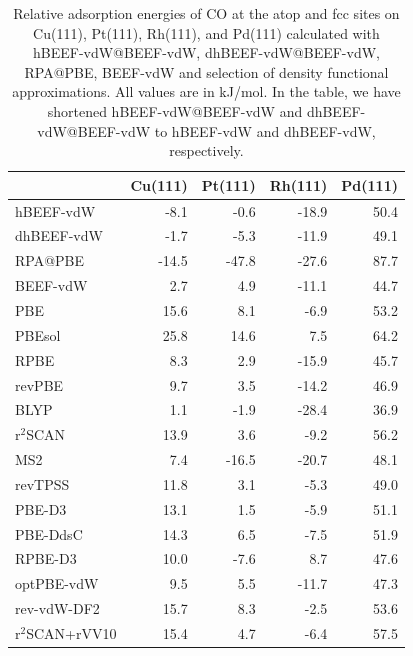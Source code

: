 \begin{table}[h]

\caption{\label{tab:co_ads}Relative adsorption energies of CO at the atop and fcc sites on Cu(111), Pt(111), Rh(111), and Pd(111) calculated with hBEEF-vdW@BEEF-vdW, dhBEEF-vdW@BEEF-vdW, RPA@PBE, BEEF-vdW and selection of density functional approximations. All values are in kJ/mol. In the table, we have shortened hBEEF-vdW@BEEF-vdW and dhBEEF-vdW@BEEF-vdW to hBEEF-vdW and dhBEEF-vdW, respectively.}
\begin{tabular}{lrrrr}
\toprule
 & Cu(111) & Pt(111) & Rh(111) & Pd(111) \\ 
\midrule
hBEEF-vdW & -8.1 & -0.6 & -18.9 & 50.4 \\
dhBEEF-vdW & -1.7 & -5.3 & -11.9 & 49.1 \\
RPA@PBE & -14.5 & -47.8 & -27.6 & 87.7 \\
BEEF-vdW & 2.7 & 4.9 & -11.1 & 44.7 \\
PBE & 15.6 & 8.1 & -6.9 & 53.2 \\
PBEsol & 25.8 & 14.6 & 7.5 & 64.2 \\
RPBE & 8.3 & 2.9 & -15.9 & 45.7 \\
revPBE & 9.7 & 3.5 & -14.2 & 46.9 \\
BLYP & 1.1 & -1.9 & -28.4 & 36.9 \\
r$^2$SCAN & 13.9 & 3.6 & -9.2 & 56.2 \\
MS2 & 7.4 & -16.5 & -20.7 & 48.1 \\
revTPSS & 11.8 & 3.1 & -5.3 & 49.0 \\
PBE-D3 & 13.1 & 1.5 & -5.9 & 51.1 \\
PBE-DdsC & 14.3 & 6.5 & -7.5 & 51.9 \\
RPBE-D3 & 10.0 & -7.6 & 8.7 & 47.6 \\
optPBE-vdW & 9.5 & 5.5 & -11.7 & 47.3 \\
rev-vdW-DF2 & 15.7 & 8.3 & -2.5 & 53.6 \\
r$^2$SCAN+rVV10 & 15.4 & 4.7 & -6.4 & 57.5 \\
\bottomrule
\end{tabular}

\end{table}